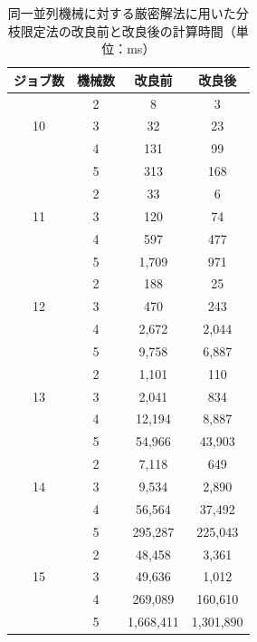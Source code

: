 \documentclass[12pt]{optlab-bachelor}
\begin{document}
\begin{table}[htb]
  \begin{center}
    \begin{tabular}{|c|c|c|c|} \hline
      ジョブ数 & 機械数 & 改良前 & 改良後 \\ \hline \hline
      & 2 & 8 & 3  \\ \cline{2-4}
      10 & 3 & 32 & 23  \\ \cline{2-4}
      & 4 & 131 & 99  \\ \cline{2-4}
      & 5 & 313 & 168  \\ \hline \hline
      & 2 & 33 & 6  \\ \cline{2-4}
      11 & 3 & 120 & 74 \\ \cline{2-4}
      & 4 & 597 & 477  \\ \cline{2-4}
      & 5 & 1,709 & 971  \\ \hline \hline
      & 2 & 188 & 25  \\ \cline{2-4}
      12 & 3 & 470 & 243  \\ \cline{2-4}
      & 4 & 2,672 & 2,044 \\ \cline{2-4}
      & 5 & 9,758 & 6,887   \\ \hline \hline
      & 2 & 1,101 & 110 \\ \cline{2-4}
      13 & 3 & 2,041 & 834 \\ \cline{2-4}
      & 4 & 12,194 & 8,887 \\ \cline{2-4}
      & 5 & 54,966 & 43,903 \\ \hline \hline
      & 2 & 7,118 & 649 \\ \cline{2-4}
      14 & 3 & 9,534 & 2,890 \\ \cline{2-4}
      & 4 & 56,564 & 37,492 \\ \cline{2-4}
      & 5 & 295,287 & 225,043  \\ \hline \hline
      & 2 & 48,458 & 3,361 \\ \cline{2-4}
      15 & 3 & 49,636 & 1,012 \\ \cline{2-4}
      & 4 & 269,089 & 160,610 \\ \cline{2-4}
      & 5 & 1,668,411 & 1,301,890  \\ \hline \hline
    \end{tabular}
    \caption{同一並列機械に対する厳密解法に用いた分枝限定法の改良前と改良後の計算時間（単位：ms）}
    \label{A2}
  \end{center}
\end{table}
\end{document}

